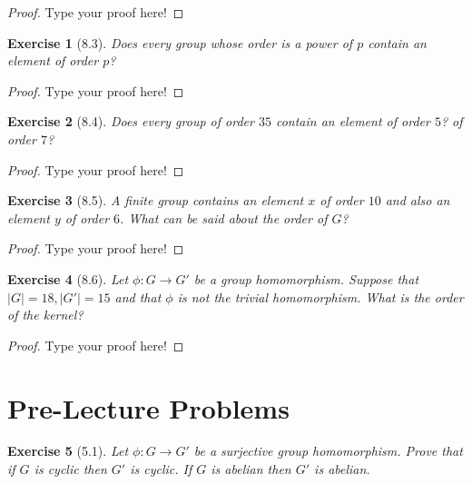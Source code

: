 \documentclass[12pt,leqno]{article}
\numberwithin{equation}{section}
\newtheorem*{exer}{Exercise}
\theoremstyle{definition}
\begin{document}
\begin{proof}[Proof]
Type your proof here!
\end{proof}


\begin{exer}[8.3] Does every group whose order is a power of $p$ contain an element of order $p$?

\end{exer}

\begin{proof}[Proof]
Type your proof here!
\end{proof}

\begin{exer}[8.4] Does every group of order $35$ contain an element of order $5$? of order $7$? 

\end{exer}

\begin{proof}[Proof]
Type your proof here!
\end{proof}

\begin{exer}[8.5] A finite group contains an element $x$ of order $10$ and also an element $y$ of order $6$. What can be said about the order of $G$? 

\end{exer}

\begin{proof}[Proof]
Type your proof here!
\end{proof}

\begin{exer}[8.6] Let $\phi:G \rightarrow G'$ be a group homomorphism. Suppose that $|G|=18, |G'|=15$ and that $\phi$ is not the trivial homomorphism. What is the order of the kernel?

\end{exer}

\begin{proof}[Proof]
Type your proof here!
\end{proof}

\section*{Pre-Lecture Problems}
\begin{exer}[5.1]  Let $\phi:G \rightarrow G'$ be a surjective group homomorphism. Prove that if $G$ is cyclic then $G'$ is cyclic. If $G$ is abelian then $G'$ is abelian.
\end{exer}
\end{document}
